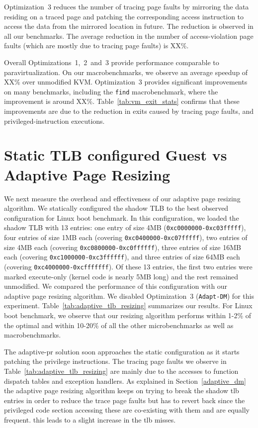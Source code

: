 Optimization~3 reduces the number of tracing page faults by mirroring the data residing on a traced page and patching the corresponding access instruction to access the data from the mirrored location in future. The reduction is observed in all our benchmarks. The average reduction in the number of access-violation page faults (which are mostly due to tracing page faults) is XX\%.

Overall Optimizations~1,~2~and~3 provide performance comparable to paravirtualization. On our macrobenchmarks, we observe an average speedup of XX\% over unmodified KVM. Optimization~3 provides significant improvements on many benchmarks, including the {\tt find} macrobenchmark, where the improvement is around XX\%. Table~\ref{tab:vm_exit_stats} confirms that these improvements are due to the reduction in exits caused by tracing page faults, and privileged-instruction executions.

\section{Static TLB configured Guest vs Adaptive Page Resizing}
\label{adaptive_pr_results}
We next measure the overhead and effectiveness of our adaptive page resizing algorithm. We statically configured the shadow TLB to the best observed configuration for Linux boot benchmark. In this configuration, we loaded the shadow TLB with 13 entries: one entry of size 4MB ({\tt 0xc0000000-0xc03fffff}), four entries of size 1MB each (covering {\tt 0xc0400000-0xc07fffff}), two entries of size 4MB each (covering {\tt 0xc0800000-0xc0ffffff}), three entries of size 16MB each (covering {\tt 0xc1000000-0xc3ffffff}), and three entries of size 64MB each (covering {\tt 0xc4000000-0xcfffffff}). Of these 13 entries, the first two entries were marked execute-only (kernel code is nearly 5MB long) and the rest remained unmodified. We compared the performance of this configuration with our adaptive page resizing algorithm. We disabled Optimization~3 ({\tt Adapt-DM}) for this experiment. Table~\ref{tab:adaptive_tlb_resizing} summarizes our results. For Linux boot benchmark, we observe that our resizing algorithm performs within 1-2\% of the optimal and within 10-20\% of all the other microbenchmarks as well as macrobenchmarks.

The adaptive-pr solution soon approaches the static configuration as it starts patching the privilege instructions. The tracing page faults we observe in Table~\ref{tab:adaptive_tlb_resizing} are mainly due to the accesses to function dispatch tables and exception handlers. As explained in Section~\ref{adaptive_dm} the adaptive page resizing algorithm keeps on trying to break the shadow tlb entries in order to reduce the trace page faults but has to revert back since the privileged code section accessing these are co-existing with them and are equally frequent. this leads to a slight increase in the tlb misses. 

